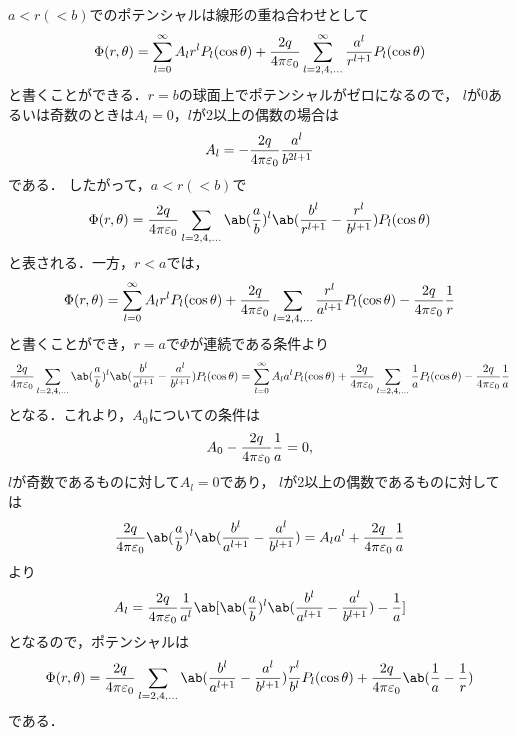   $a < r ( < b)$でのポテンシャルは線形の重ね合わせとして
  \begin{gather}%
    \Phi(r, \theta) = \sum_{l=0}^\infty A_l r^l P_l(\cos\theta) + \frac{2q}{4\pi \eps_0} \sum_{l = 2, 4, \ldots}^\infty \frac{a^l}{r^{l+1}}P_l(\cos\theta)
  \end{gather}%
  と書くことができる．$r = b$の球面上でポテンシャルがゼロになるので，
  $l$が$0$あるいは奇数のときは$A_l = 0$，$l$が2以上の偶数の場合は
  \begin{gather}%
    A_l = -\frac{2q}{4\pi\eps_0} \frac{a^l}{b^{2l+1}}
  \end{gather}%
  である．
  したがって，$a < r (< b)$で
  \begin{gather}%
    \Phi(r, \theta) = \frac{2q}{4\pi\eps_0} \sum_{l = 2, 4, \ldots} \ab(\frac ab)^l \ab(
    \frac{b^l}{r^{l+1}} - \frac{r^l}{b^{l+1}}) P_l(\cos\theta)
  \end{gather}%
  と表される．一方，$r < a$では，
  \begin{gather}%
    \Phi(r, \theta) = \sum_{l=0}^\infty A_l r^l P_l(\cos\theta) + \frac{2q}{4\pi\eps_0} \sum_{l=2, 4, \ldots}\frac{r^l}{a^{l+1}} P_l(\cos\theta) - \frac{2q}{4\pi\eps_0} \frac{1}{r}
  \end{gather}%
  と書くことができ，$r = a$で$\Phi$が連続である条件より
  \begin{gather}%
    \frac{2q}{4\pi\eps_0} \sum_{l=2, 4, \ldots}\ab(\frac ab)^l\ab(\frac{b^l}{a^{l+1}} - \frac{a^l}{b^{l+1}}) P_l(\cos\theta)= \sum_{l=0}^\infty A_l a^l P_l(\cos\theta) + \frac{2q}{4\pi\eps_0} \sum_{l=2, 4, \ldots} \frac{1}{a} P_l(\cos\theta) - \frac{2q}{4\pi\eps_0}\frac{1}{a}
  \end{gather}%
  となる．これより，$A_0$についての条件は
  \begin{gather}%
    A_0 - \frac{2q}{4\pi\eps_0} \frac{1}{a} = 0,
  \end{gather}%
  $l$が奇数であるものに対して$A_l = 0$であり，
  $l$が2以上の偶数であるものに対しては
  \begin{gather}%
    \frac{2q}{4\pi\eps_0} \ab(\frac ab)^l\ab(\frac{b^l}{a^{l+1}} - \frac{a^l}{b^{l+1}}) = A_l a^l + \frac{2q}{4\pi\eps_0} \frac{1}{a}
  \end{gather}%
  より
  \begin{gather}%
    A_l = \frac{2q}{4\pi\eps_0}\frac{1}{a^l} \ab[\ab(\frac ab)^l\ab(\frac{b^l}{a^{l+1}} - \frac{a^l}{b^{l+1}}) - \frac 1a] 
  \end{gather}%
  となるので，ポテンシャルは
  \begin{gather}%
    \Phi(r, \theta) = \frac{2q}{4\pi\eps_0} \sum_{l = 2, 4, \ldots}  \ab(\frac{b^l}{a^{l+1}} - \frac{a^l}{b^{l+1}})\frac{r^l}{b^l} P_l(\cos\theta) + \frac{2q}{4\pi\eps_0} \ab(\frac 1a - \frac 1r)
  \end{gather}%
  である．

